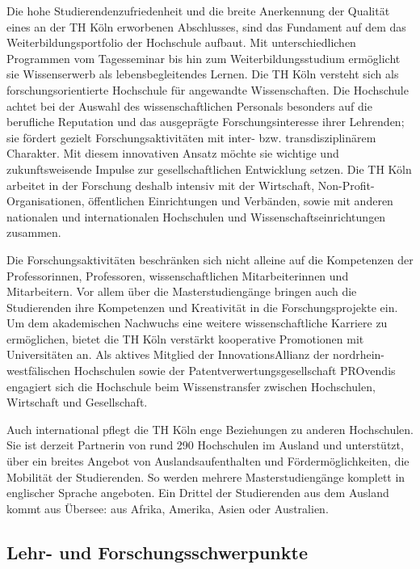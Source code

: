 Die hohe Studierendenzufriedenheit und die breite Anerkennung der
Qualität eines an der TH Köln erworbenen Abschlusses, sind das Fundament
auf dem das Weiterbildungsportfolio der Hochschule aufbaut. Mit
unterschiedlichen Programmen vom Tagesseminar bis hin zum
Weiterbildungsstudium ermöglicht sie Wissenserwerb als
lebensbegleitendes Lernen. Die TH Köln versteht sich als
forschungsorientierte Hochschule für angewandte Wissenschaften. Die
Hochschule achtet bei der Auswahl des wissenschaftlichen Personals
besonders auf die berufliche Reputation und das ausgeprägte
Forschungsinteresse ihrer Lehrenden; sie fördert gezielt
Forschungsaktivitäten mit inter- bzw. transdisziplinärem Charakter. Mit
diesem innovativen Ansatz möchte sie wichtige und zukunftsweisende
Impulse zur gesellschaftlichen Entwicklung setzen. Die TH Köln arbeitet
in der Forschung deshalb intensiv mit der Wirtschaft,
Non-Profit-Organisationen, öffentlichen Einrichtungen und Verbänden,
sowie mit anderen nationalen und internationalen Hochschulen und
Wissenschaftseinrichtungen zusammen.

Die Forschungsaktivitäten beschränken sich nicht alleine auf die
Kompetenzen der Professorinnen, Professoren, wissenschaftlichen
Mitarbeiterinnen und Mitarbeitern. Vor allem über die Masterstudiengänge
bringen auch die Studierenden ihre Kompetenzen und Kreativität in die
Forschungsprojekte ein. Um dem akademischen Nachwuchs eine weitere
wissenschaftliche Karriere zu ermöglichen, bietet die TH Köln verstärkt
kooperative Promotionen mit Universitäten an. Als aktives Mitglied der
InnovationsAllianz der nordrhein-westfälischen Hochschulen sowie der
Patentverwertungsgesellschaft PROvendis engagiert sich die Hochschule
beim Wissenstransfer zwischen Hochschulen, Wirtschaft und Gesellschaft.

Auch international pflegt die TH Köln enge Beziehungen zu anderen
Hochschulen. Sie ist derzeit Partnerin von rund 290 Hochschulen im
Ausland und unterstützt, über ein breites Angebot von
Auslandsaufenthalten und Fördermöglichkeiten, die Mobilität der
Studierenden. So werden mehrere Masterstudiengänge komplett in
englischer Sprache angeboten. Ein Drittel der Studierenden aus dem
Ausland kommt aus Übersee: aus Afrika, Amerika, Asien oder Australien.

\subsection{Lehr- und
Forschungsschwerpunkte}\label{lehr--und-forschungsschwerpunkte}

